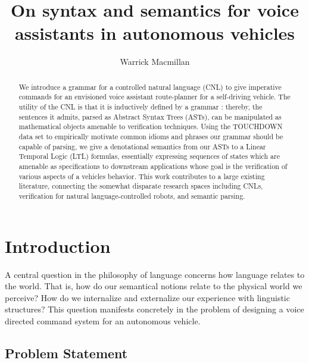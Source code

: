 \documentclass{article}
\author{Warrick Macmillan}
\title{On syntax and semantics for voice assistants in autonomous vehicles}
\begin{document}
\begin{titlepage}

\maketitle

\begin{abstract}

We introduce a grammar for a controlled natural language (CNL) to give
imperative commands for an envisioned voice assistant route-planner for a
self-driving vehicle. The utility of the CNL is that it is inductively defined
by a grammar : thereby, the sentences it admits, parsed as Abstract Syntax Trees
(ASTs), can be manipulated as mathematical objects amenable to verification
techniques. Using the TOUCHDOWN data set to empirically motivate common idioms
and phrases our grammar should be capable of parsing, we give a denotational
semantics from our ASTs to a Linear Temporal Logic (LTL) formulas, essentially
expressing sequences of states which are amenable as specifications to
downstream applications whose goal is the verification of various aspects of a
vehicles behavior. This work contributes to a large existing literature,
connecting the somewhat disparate research spaces including CNLs, verification
for natural language-controlled robots, and semantic parsing.

\end{abstract}

\vfill

\thispagestyle{empty}
\end{titlepage}

\newpage
\tableofcontents




\section{Introduction}

A central question in the philosophy of language concerns how language relates
to the world. That is, how do our semantical notions relate to the physical
world we perceive? How do we internalize and externalize our experience with
linguistic structures? This question manifests concretely in the problem of
designing a voice directed command system for an autonomous vehicle.

\subsection{Problem Statement}
\end{document}
